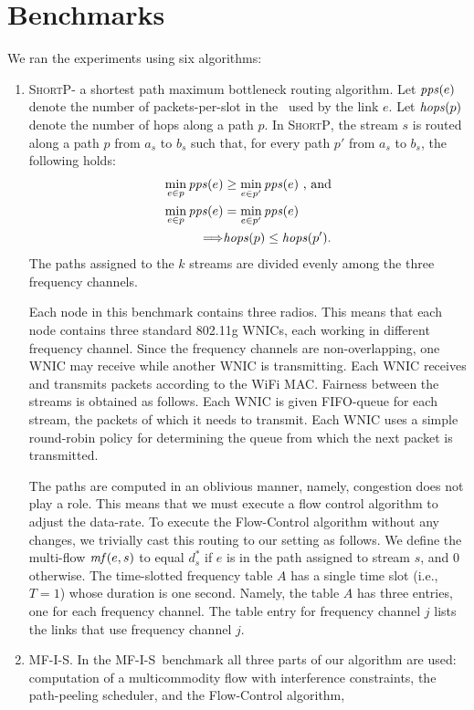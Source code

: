 \documentclass[12pt,oneside,english,a4paper]{book}
\theoremstyle{plain}
\theoremstyle{definition}
\theoremstyle{Theorem}
\theoremstyle{plain}
\newenvironment{proof sketch}[1]{\noindent {\emph{Proof sketch of #1:}}}{\hfill \qed}
\newcommand{\pps}{\text{\emph{pps}}}
\newcommand{\hops}{\text{\emph{hops}}}
\newcommand{\mf}{\text{\emph{mf}}}
\newcommand{\MCS}{\text{\sc{mcs}}}
\newcommand{\algA}{\textsc{MF-I-S}}
\newcommand{\algB}{\textsc{ShortP}}
\newcommand{\algS}{\algB}
\begin{document}
\section{Benchmarks}\label{sec:bench}
We ran the experiments using six algorithms:
\begin{enumerate}
\item \algS - a shortest path maximum bottleneck routing algorithm.
  Let $\pps(e)$ denote the number of packets-per-slot in the
  \MCS\ used by the link $e$.  Let $\hops(p)$ denote the number of
  hops along a path $p$. In \algS, the stream $s$ is routed along a
  path $p$ from $a_s$ to $b_s$ such that, for every path $p'$ from
  $a_s$ to $b_s$, the following holds:
  \begin{align*}
    \min_{e \in p} \pps(e) &\geq \min_{e \in p'} \pps(e) \text{ , and}\\
    \min_{e \in p} \pps(e) &= \min_{e \in p'} \pps(e)  \\
\Longrightarrow &\hops(p) \leq \hops(p').
  \end{align*}
  The paths assigned to the $k$ streams are divided evenly among the
  three frequency channels.

Each node in this benchmark contains three
  radios. This means that each node contains three standard 802.11g
  WNICs, each working in different frequency channel.  Since the
  frequency channels are non-overlapping, one WNIC may receive while
  another WNIC is transmitting.  Each WNIC receives and transmits
  packets according to the WiFi MAC.  Fairness between the streams is
  obtained as follows.  Each WNIC is given FIFO-queue for each stream,
  the packets of which it needs to transmit. Each WNIC uses a simple
  round-robin policy for determining the queue from which the next
  packet is transmitted.

  The paths are computed in an oblivious manner, namely, congestion
  does not play a role. This means that we must execute a flow control
  algorithm to adjust the data-rate.  To execute the Flow-Control
  algorithm without any changes, we trivially cast this routing to our
  setting as follows.  We define the multi-flow $\mf(e,s)$ to equal
  $d^*_s$ if $e$ is in the path assigned to stream $s$, and $0$
  otherwise. The time-slotted frequency table $A$ has a single time
  slot (i.e., $T=1$) whose duration is one second. Namely, the table
  $A$ has three entries, one for each frequency channel.  The table
  entry for frequency channel $j$ lists the links that use frequency
  channel $j$.
\item \algA. In the \algA\ benchmark all three parts of our algorithm
  are used: computation of a multicommodity flow with interference
  constraints, the path-peeling scheduler, and the Flow-Control
  algorithm,


\end{enumerate}
\end{document}
